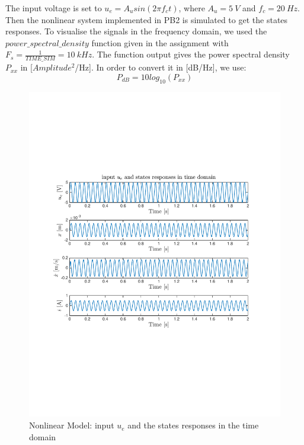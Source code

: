 The input voltage is set to $u_e = A_u sin(2\pi f_c t)$, where $A_u = 5 \ V$ and $f_c = 20 \ Hz$.
Then the nonlinear system implemented in PB2 is simulated to get the states responses. To visualise the signals in the frequency domain, we used the \textit{$power\_spectral\_density$} function given in the assignment \cite{assign} with $F_s = \frac{1}{TIME\_SIM} = 10 \ kHz$. The function output gives the power spectral density $P_{xx}$ in [$Amplitude^2$/Hz]. In order to convert it in [dB/Hz], we use: 
\begin{equation*}
P_{dB} = 10log_{10}(P_{xx})
\end{equation*} 

\begin{figure}[H]
 \centering 
 \includegraphics[trim=2cm 7cm 2cm 7cm, clip=true, totalheight=0.35\textheight, angle=0]{figures/responseNLMt2.pdf}
 \caption{Nonlinear Model: input $u_e$ and the states responses in the time domain}
 \label{fig:NLMt}
\end{figure}

